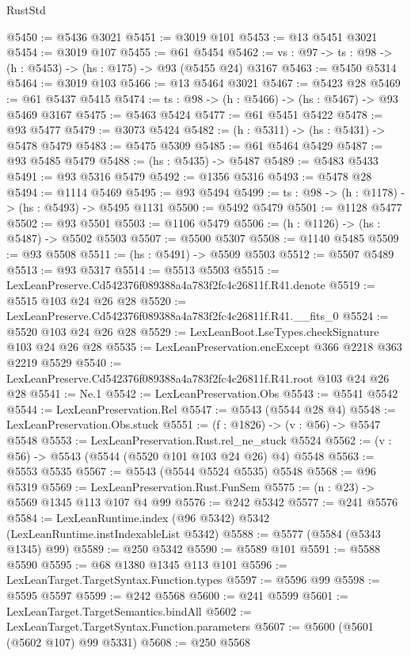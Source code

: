 \begin{lexlean}{RustStd}
\begin{coremodule}
@5450 := @5436 @3021
@5451 := @3019 @101
@5453 := @13 @5451 @3021
@5454 := @3019 @107
@5455 := @61 @5454
@5462 := {vs : @97} -> {ts : @98} -> (h : @5453) -> (hs : @175) -> @93 (@5455 @24) @3167
@5463 := @5450 @5314
@5464 := @3019 @103
@5466 := @13 @5464 @3021
@5467 := @5423 @28
@5469 := @61 @5437 @5415
@5474 := {ts : @98} -> (h : @5466) -> (hs : @5467) -> @93 @5469 @3167
@5475 := @5463 @5424
@5477 := @61 @5451 @5422
@5478 := @93 @5477
@5479 := @3073 @5424
@5482 := (h : @5311) -> (hs : @5431) -> @5478 @5479
@5483 := @5475 @5309
@5485 := @61 @5464 @5429
@5487 := @93 @5485 @5479
@5488 := (hs : @5435) -> @5487
@5489 := @5483 @5433
@5491 := @93 @5316 @5479
@5492 := @1356 @5316
@5493 := @5478 @28
@5494 := @1114 @5469
@5495 := @93 @5494
@5499 := {ts : @98} -> (h : @1178) -> (hs : @5493) -> @5495 @1131
@5500 := @5492 @5479
@5501 := @1128 @5477
@5502 := @93 @5501
@5503 := @1106 @5479
@5506 := (h : @1126) -> (hs : @5487) -> @5502 @5503
@5507 := @5500 @5307
@5508 := @1140 @5485
@5509 := @93 @5508
@5511 := (hs : @5491) -> @5509 @5503
@5512 := @5507 @5489
@5513 := @93 @5317
@5514 := @5513 @5503
@5515 := LexLeanPreserve.Cd542376f089388a4a783f2fc4c26811f.R41.denote
@5519 := @5515 @103 @24 @26 @28
@5520 := LexLeanPreserve.Cd542376f089388a4a783f2fc4c26811f.R41.__fits_0
@5524 := @5520 @103 @24 @26 @28
@5529 := LexLeanBoot.LseTypes.checkSignature @103 @24 @26 @28
@5535 := LexLeanPreservation.encExcept @366 @2218 @363 @2219 @5529
@5540 := LexLeanPreserve.Cd542376f089388a4a783f2fc4c26811f.R41.root @103 @24 @26 @28
@5541 := Ne.{1}
@5542 := LexLeanPreservation.Obs
@5543 := @5541 @5542
@5544 := LexLeanPreservation.Rel
@5547 := @5543 (@5544 @28 @4)
@5548 := LexLeanPreservation.Obs.stuck
@5551 := (f : @1826) -> (v : @56) -> @5547 @5548
@5553 := LexLeanPreservation.Rust.rel_ne_stuck @5524
@5562 := (v : @56) -> @5543 (@5544 (@5520 @101 @103 @24 @26) @4) @5548
@5563 := @5553 @5535
@5567 := @5543 (@5544 @5524 @5535) @5548
@5568 := @96 @5319
@5569 := LexLeanPreservation.Rust.FunSem
@5575 := (n : @23) -> @5569 @1345 @113 @107 @4 @99
@5576 := @242 @5342
@5577 := @241 @5576
@5584 := LexLeanRuntime.index (@96 @5342) @5342 (LexLeanRuntime.instIndexableList @5342)
@5588 := @5577 (@5584 (@5343 @1345) @99)
@5589 := @250 @5342
@5590 := @5589 @101
@5591 := @5588 @5590
@5595 := @68 @1380 @1345 @113 @101
@5596 := LexLeanTarget.TargetSyntax.Function.types
@5597 := @5596 @99
@5598 := @5595 @5597
@5599 := @242 @5568
@5600 := @241 @5599
@5601 := LexLeanTarget.TargetSemantics.bindAll
@5602 := LexLeanTarget.TargetSyntax.Function.parameters
@5607 := @5600 (@5601 (@5602 @107) @99 @5331)
@5608 := @250 @5568

\end{coremodule}
\end{lexlean}
